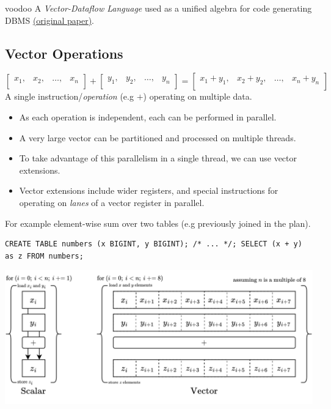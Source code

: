 \begin{definitionbox}{voodoo}
    A \textit{Vector-Dataflow Language} used as a unified algebra for code generating DBMS
    \href{https://www.cs.albany.edu/~jhh/courses/readings/pirk.pvldb16.pdf}{(original paper)}.
\end{definitionbox}

\subsection{Vector Operations}
\[\begin{bmatrix}
        x_1, & x_2, & \dots, & x_n \\
    \end{bmatrix} + \begin{bmatrix}
        y_1, & y_2, & \dots, & y_n \\
    \end{bmatrix} = \begin{bmatrix}
        x_1 + y_1, & x_2 + y_2, & \dots, & x_n + y_n \\
    \end{bmatrix}\]
A single instruction/\textit{operation} (e.g $+$) operating on multiple data.
\begin{itemize}
    \item As each operation is independent, each can be performed in parallel.
    \item A very large vector can be partitioned and processed on multiple threads.
    \item To take advantage of this parallelism in a single thread, we can use vector extensions.
    \item Vector extensions include wider registers, and special instructions for operating on \textit{lanes} of a vector register in parallel.
\end{itemize}
\noindent For example element-wise sum over two tables (e.g previously joined in the plan).
\begin{verbatim}
CREATE TABLE numbers (x BIGINT, y BIGINT); /* ... */; SELECT (x + y) as z FROM numbers;
\end{verbatim}
\begin{center}
    \includegraphics[width=\textwidth]{advanced_topics/images/vector_arithmetic.drawio.png}
\end{center}
